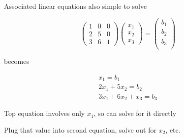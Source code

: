 \begin{frame}

    \vspace{2em}
    Associated linear equations also simple to solve 

  \vspace{0.7em}

    \Eg
    \begin{equation*}
        \left(
        \begin{array}{ccc}
            1 & 0 & 0  \\
            2 & 5 & 0 \\
            3 & 6 & 1
        \end{array}
        \right)
        \left(
        \begin{array}{ccc}
            x_1 \\
            x_2 \\
            x_3 
        \end{array}
        \right)
        =
        \left(
        \begin{array}{c}
            b_1 \\
            b_2 \\
            b_3 \\
        \end{array}
        \right)
    \end{equation*}
    
    becomes

    \begin{equation*}
        \begin{array}{c}
            x_1  = b_1  \\
            2x_1 + 5x_2 = b_2 \\
            3x_1 + 6x_2 + x_3 = b_3
        \end{array}
    \end{equation*}

    Top equation involves only $x_1$, so can solve for it directly

    Plug that value into second equation, solve out for $x_2$, etc.

\end{frame}


